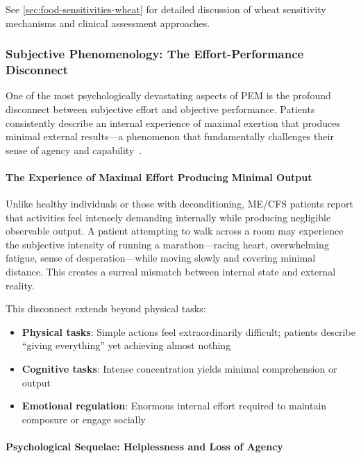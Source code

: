 See \cref{sec:food-sensitivities-wheat} for detailed discussion of wheat sensitivity mechanisms and clinical assessment approaches.

\subsubsection{Subjective Phenomenology: The Effort-Performance Disconnect}

One of the most psychologically devastating aspects of PEM is the profound disconnect between subjective effort and objective performance. Patients consistently describe an internal experience of maximal exertion that produces minimal external results---a phenomenon that fundamentally challenges their sense of agency and capability~\cite{strassheim2021experiences,fennell2021elements}.

\paragraph{The Experience of Maximal Effort Producing Minimal Output}

Unlike healthy individuals or those with deconditioning, ME/CFS patients report that activities feel intensely demanding internally while producing negligible observable output. A patient attempting to walk across a room may experience the subjective intensity of running a marathon---racing heart, overwhelming fatigue, sense of desperation---while moving slowly and covering minimal distance. This creates a surreal mismatch between internal state and external reality.

This disconnect extends beyond physical tasks:
\begin{itemize}
    \item \textbf{Physical tasks}: Simple actions feel extraordinarily difficult; patients describe ``giving everything'' yet achieving almost nothing
    \item \textbf{Cognitive tasks}: Intense concentration yields minimal comprehension or output
    \item \textbf{Emotional regulation}: Enormous internal effort required to maintain composure or engage socially
\end{itemize}

\paragraph{Psychological Sequelae: Helplessness and Loss of Agency}

